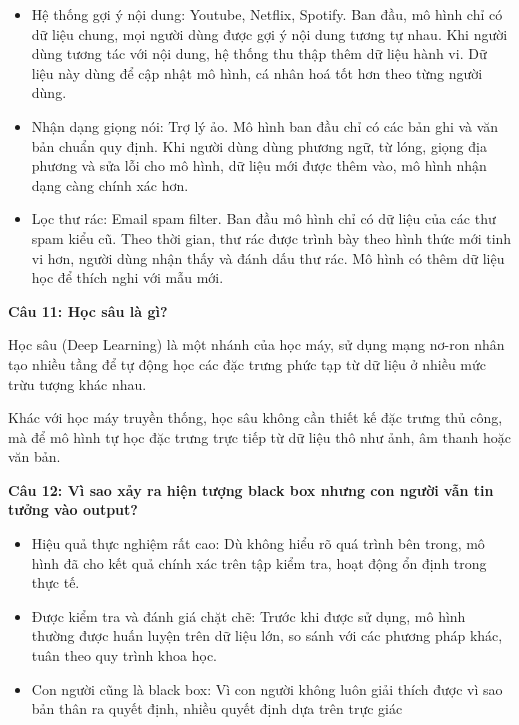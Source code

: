\begin{itemize}
	\item Hệ thống gợi ý nội dung: Youtube, Netflix, Spotify. Ban đầu, mô hình chỉ có dữ liệu chung, mọi người dùng được gợi ý nội dung tương tự nhau. Khi người dùng tương tác với nội dung, hệ thống thu thập thêm dữ liệu hành vi. Dữ liệu này dùng để cập nhật mô hình, cá nhân hoá tốt hơn theo từng người dùng.
	
	\item Nhận dạng giọng nói: Trợ lý ảo. Mô hình ban đầu chỉ có các bản ghi và văn bản chuẩn quy định. Khi người dùng dùng phương ngữ, từ lóng, giọng địa phương và sửa lỗi cho mô hình, dữ liệu mới được thêm vào, mô hình nhận dạng càng chính xác hơn.
	
	\item Lọc thư rác: Email spam filter. Ban đầu mô hình chỉ có dữ liệu của các thư spam kiểu cũ. Theo thời gian, thư rác được trình bày theo hình thức mới tinh vi hơn, người dùng nhận thấy và đánh dấu thư rác. Mô hình có thêm dữ liệu học để thích nghi với mẫu mới.
\end{itemize}

\textbf{Câu 11: Học sâu là gì?}

Học sâu (Deep Learning) là một nhánh của học máy, sử dụng mạng nơ-ron nhân tạo nhiều tầng để tự động học các đặc trưng phức tạp từ dữ liệu ở nhiều mức trừu tượng khác nhau.

Khác với học máy truyền thống, học sâu không cần thiết kế đặc trưng thủ công, mà để mô hình tự học đặc trưng trực tiếp từ dữ liệu thô như ảnh, âm thanh hoặc văn bản.

\textbf{Câu 12: Vì sao xảy ra hiện tượng black box nhưng con người vẫn tin tưởng vào output?}

\begin{itemize}
	\item Hiệu quả thực nghiệm rất cao: Dù không hiểu rõ quá trình bên trong, mô hình đã cho kết quả chính xác trên tập kiểm tra, hoạt động ổn định trong thực tế.
	
	\item Được kiểm tra và đánh giá chặt chẽ: Trước khi được sử dụng, mô hình thường được huấn luyện trên dữ liệu lớn, so sánh với các phương pháp khác, tuân theo quy trình khoa học.
	
	\item Con người cũng là black box: Vì con người không luôn giải thích được vì sao bản thân ra quyết định, nhiều quyết định dựa trên trực giác
\end{itemize}

